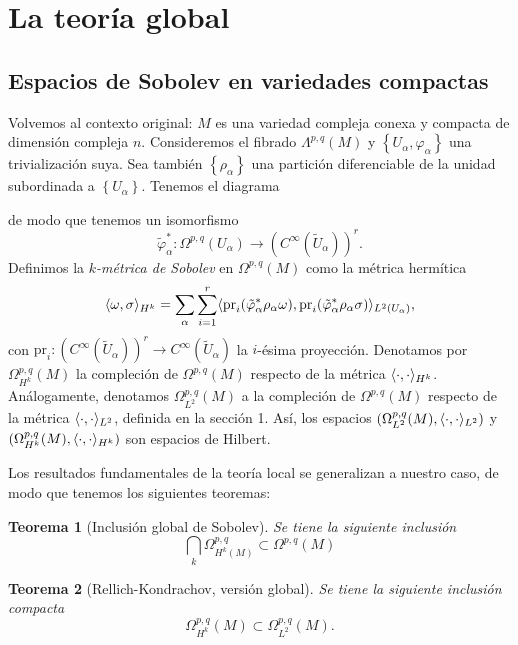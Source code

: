 \documentclass[12pt,a4paper]{article}
\newtheorem{thm}{Teorema}[section]
\theoremstyle{definition} \newtheorem{defn}[thm]{Definición}
\theoremstyle{definition} \newtheorem{ejemplo}[thm]{Ejemplo}
\theoremstyle{definition} \newtheorem{ejercicio}[thm]{Ejercicio}
\theoremstyle{remark} \newtheorem*{obs}{Observación}
\DeclarePairedDelimiter\esc{\langle}{\rangle}
\newcommand{\CC}{\mathbb{C}}
\newcommand{\pr}{\mathrm{pr}}
\begin{document}
  \section{La teoría global}
  \subsection{Espacios de Sobolev en variedades compactas}
  Volvemos al contexto original: $M$ es una variedad compleja conexa y compacta de dimensión compleja $n$. Consideremos el fibrado $\Lambda^{p,q}(M)$ y $\left\{ U_\alpha, \varphi_\alpha \right\}$ una trivialización suya. Sea también $\left\{ \rho_\alpha \right\}$ una partición diferenciable de la unidad subordinada a $\left\{ U_\alpha \right\}$. Tenemos el diagrama
  \begin{center}
   \end{center}
   de modo que tenemos un isomorfismo
   \begin{equation*}
     \tilde{\varphi}_\alpha^*:\Omega^{p,q}(U_\alpha) \rightarrow (C^\infty(\tilde{U}_{\alpha}))^r.
   \end{equation*}
   Definimos la \emph{$k$-métrica de Sobolev} en $\Omega^{p,q}(M)$ como la métrica hermítica
   \begin{equation*}
     \esc{\omega,\sigma}_{H^k}=\sum_\alpha \sum_{i=1}^r \esc{\pr_i (\tilde{\varphi}_\alpha^* \rho_\alpha \omega),\pr_i(\tilde{\varphi}_\alpha^* \rho_\alpha \sigma)}_{L^2(U_\alpha)},
   \end{equation*}
   con $\pr_i: (C^\infty(\tilde{U}_\alpha))^r \rightarrow C^\infty(\tilde{U}_\alpha)$ la $i$-ésima proyección. 
   Denotamos por $\Omega^{p,q}_{H^k}(M)$ la compleción de $\Omega^{p,q}(M)$ respecto de la métrica $\esc{\cdot,\cdot}_{H^k}$. Análogamente, denotamos $\Omega^{p,q}_{L^2}(M)$ a la compleción de $\Omega^{p,q}(M)$ respecto de la métrica $\esc{\cdot,\cdot}_{L^2}$, definida en la sección 1. Así, los espacios $(\Omega^{p,q}_{L^2}(M),\esc{\cdot,\cdot}_{L^2})$ y $(\Omega^{p,q}_{H^k}(M),\esc{\cdot,\cdot}_{H^k})$ son espacios de Hilbert.
   
   Los resultados fundamentales de la teoría local se generalizan a nuestro caso, de modo que tenemos los siguientes teoremas:
   \begin{thm}[Inclusión global de Sobolev]
     Se tiene la siguiente inclusión
     \begin{equation*}
     \bigcap_k\Omega^{p,q}_{H^k(M)}\subset \Omega^{p,q}(M)
     \end{equation*}
   \end{thm}
   \begin{thm}[Rellich-Kondrachov, versión global]
  Se tiene la siguiente inclusión compacta  $$\Omega_{H^k}^{p,q}(M) \subset \Omega_{L^2}^{p,q}(M).$$ 
   \end{thm}
\end{document}
